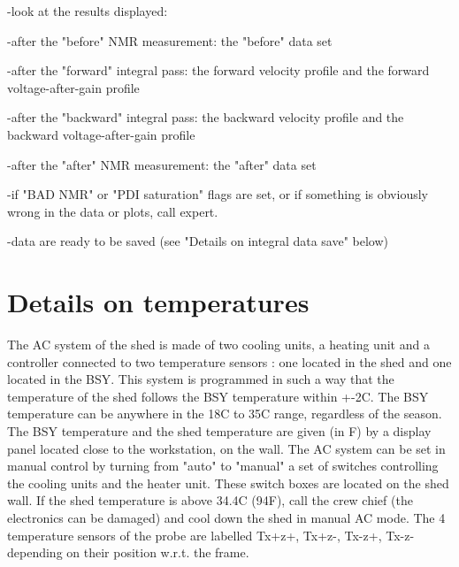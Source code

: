 {-look at the results displayed: 

-after the "before" NMR measurement: the 
"before"
data set 

-after the "forward" integral pass: the forward velocity profile
and the forward voltage-after-gain profile 

-after the "backward" integral pass: the backward velocity
profile and the backward voltage-after-gain profile 

-after the "after" NMR measurement: the 
"after"
data set 

-if "BAD NMR" or "PDI saturation" flags
are set, or if something is obviously wrong in the data or plots, call expert. 

-data are ready to be saved (see "Details on integral data save"
below) 


\section{Details on temperatures }

The AC system of the shed is made of two cooling units, a heating unit and a
controller connected to two temperature sensors : one located in the shed and
one located in the BSY. This system is programmed in such a way that the 
temperature
of the shed follows the BSY temperature within +-2C. The BSY temperature can
be anywhere in the 18C to 35C range, regardless of the season. The BSY 
temperature
and the shed temperature are given (in F) by a display panel located close to
the workstation, on the wall. The AC system can be set in manual control by
turning from "auto" to "manual" a set of
switches controlling the cooling units and the heater unit. These switch boxes
are located on the shed wall. If the shed temperature is above 34.4C (94F),
call the crew chief (the electronics can be damaged) and cool down the shed in manual
AC mode. The 4 temperature sensors of the probe are labelled Tx+z+, Tx+z-, Tx-z+,
Tx-z- depending on their position w.r.t. the frame. 

}
